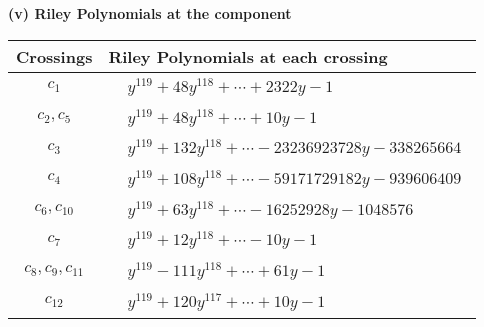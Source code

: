 \documentclass[1p]{elsarticle_modified}
\theoremstyle{definition}
\begin{document}
\newpage\renewcommand{\arraystretch}{1}
\flushleft \textbf{(v) Riley Polynomials at the component}\newline \\
\begin{tabular}{m{50pt}|m{274pt}}
Crossings & \hspace{64pt}Riley Polynomials at each crossing \\
\hline $$\begin{aligned}c_{1}\end{aligned}$$&$\begin{aligned}
&y^{119}+48 y^{118}+\cdots+2322 y-1
\end{aligned}$\\
\hline $$\begin{aligned}c_{2},c_{5}\end{aligned}$$&$\begin{aligned}
&y^{119}+48 y^{118}+\cdots+10 y-1
\end{aligned}$\\
\hline $$\begin{aligned}c_{3}\end{aligned}$$&$\begin{aligned}
&y^{119}+132 y^{118}+\cdots-23236923728 y-338265664
\end{aligned}$\\
\hline $$\begin{aligned}c_{4}\end{aligned}$$&$\begin{aligned}
&y^{119}+108 y^{118}+\cdots-59171729182 y-939606409
\end{aligned}$\\
\hline $$\begin{aligned}c_{6},c_{10}\end{aligned}$$&$\begin{aligned}
&y^{119}+63 y^{118}+\cdots-16252928 y-1048576
\end{aligned}$\\
\hline $$\begin{aligned}c_{7}\end{aligned}$$&$\begin{aligned}
&y^{119}+12 y^{118}+\cdots-10 y-1
\end{aligned}$\\
\hline $$\begin{aligned}c_{8},c_{9},c_{11}\end{aligned}$$&$\begin{aligned}
&y^{119}-111 y^{118}+\cdots+61 y-1
\end{aligned}$\\
\hline $$\begin{aligned}c_{12}\end{aligned}$$&$\begin{aligned}
&y^{119}+120 y^{117}+\cdots+10 y-1
\end{aligned}$\\
\hline
\end{tabular}\\~\\
\end{document}
